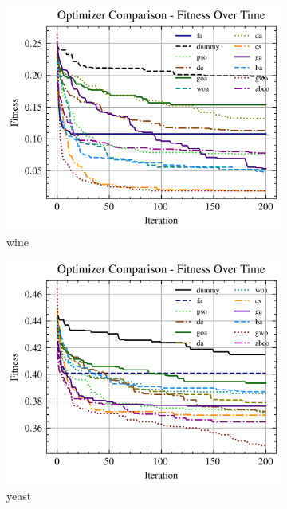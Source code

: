 \begin{figure}[htp]
\begin{subfigure}[htp]{0.45\textwidth}
        \includegraphics[width=\textwidth]{imagenes/fitness_charts/img/real/wine/optimizers_fitness_svc.png}
        \caption{wine}
    \end{subfigure}
    \begin{subfigure}[htp]{0.45\textwidth}
        \includegraphics[width=\textwidth]{imagenes/fitness_charts/img/real/yeast/optimizers_fitness_svc.png}
        \caption{yeast}
    \end{subfigure}
    \begin{subfigure}[htp]{0.45\textwidth}

\end{subfigure}
\end{figure}
